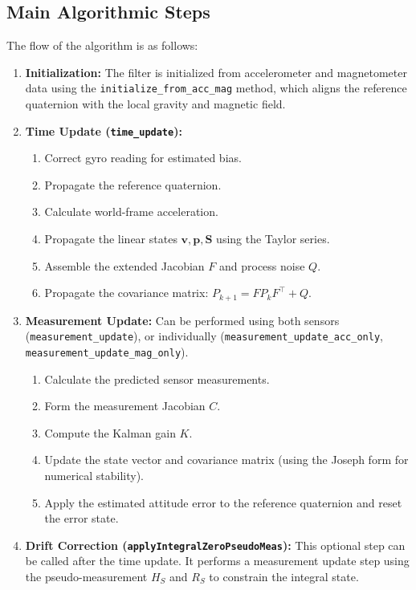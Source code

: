\documentclass[11pt,letterpaper]{article}
\begin{document}
\subsection{Main Algorithmic Steps}
The flow of the algorithm is as follows:
\begin{enumerate}
    \item \textbf{Initialization:} The filter is initialized from accelerometer and magnetometer data using the \texttt{initialize\_from\_acc\_mag} method, which aligns the reference quaternion with the local gravity and magnetic field.
    \item \textbf{Time Update (\texttt{time\_update}):}
    \begin{enumerate}
        \item Correct gyro reading for estimated bias.
        \item Propagate the reference quaternion.
        \item Calculate world-frame acceleration.
        \item Propagate the linear states $\bm{v}, \bm{p}, \bm{S}$ using the Taylor series.
        \item Assemble the extended Jacobian $F$ and process noise $Q$.
        \item Propagate the covariance matrix: $P_{k+1} = F P_k F^\top + Q$.
    \end{enumerate}
    \item \textbf{Measurement Update:} Can be performed using both sensors (\texttt{measurement\_update}), or individually (\texttt{measurement\_update\_acc\_only}, \texttt{measurement\_update\_mag\_only}).
    \begin{enumerate}
        \item Calculate the predicted sensor measurements.
        \item Form the measurement Jacobian $C$.
        \item Compute the Kalman gain $K$.
        \item Update the state vector and covariance matrix (using the Joseph form for numerical stability).
        \item Apply the estimated attitude error to the reference quaternion and reset the error state.
    \end{enumerate}
    \item \textbf{Drift Correction (\texttt{applyIntegralZeroPseudoMeas}):} This optional step can be called after the time update. It performs a measurement update step using the pseudo-measurement $H_S$ and $R_S$ to constrain the integral state.
\end{enumerate}
\end{document}
